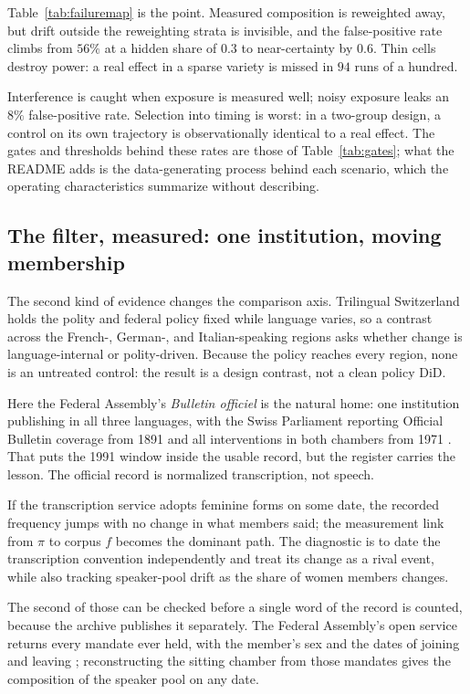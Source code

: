 Table~\ref{tab:failuremap} is the point. Measured composition is reweighted away, but drift outside the reweighting strata is invisible, and the false-positive rate climbs from $56\%$ at a hidden share of $0.3$ to near-certainty by $0.6$. Thin cells destroy power: a real effect in a sparse variety is missed in $94$ runs of a hundred.

Interference is caught when exposure is measured well; noisy exposure leaks an $8\%$ false-positive rate. Selection into timing is worst: in a two-group design, a control on its own trajectory is observationally identical to a real effect. The gates and thresholds behind these rates are those of Table~\ref{tab:gates}; what the README adds is the data-generating process behind each scenario, which the operating characteristics summarize without describing.

\subsection{The filter, measured: one institution, moving membership}

The second kind of evidence changes the comparison axis. Trilingual Switzerland holds the polity and federal policy fixed while language varies, so a contrast across the French-, German-, and Italian-speaking regions asks whether change is language-internal or polity-driven. Because the policy reaches every region, none is an untreated control: the result is a design contrast, not a clean policy DiD.

Here the Federal Assembly's \emph{Bulletin officiel} is the natural home: one institution publishing in all three languages, with the Swiss Parliament reporting Official Bulletin coverage from 1891 and all interventions in both chambers from 1971 \citep{swissParliamentPublicAccess}. That puts the 1991 window inside the usable record, but the register carries the lesson. The official record is normalized transcription, not speech.

If the transcription service adopts feminine forms on some date, the recorded frequency jumps with no change in what members said; the measurement link from $\pi$ to corpus $f$ becomes the dominant path. The diagnostic is to date the transcription convention independently and treat its change as a rival event, while also tracking speaker-pool drift as the share of women members changes.

The second of those can be checked before a single word of the record is counted, because the archive publishes it separately. The Federal Assembly's open service returns every mandate ever held, with the member's sex and the dates of joining and leaving \citep{swissParliamentOData}; reconstructing the sitting chamber from those mandates gives the composition of the speaker pool on any date.

